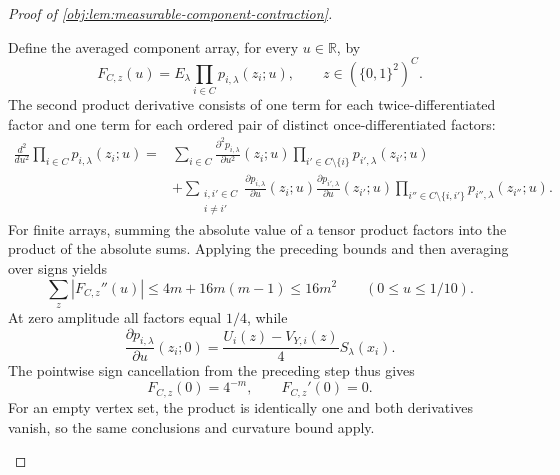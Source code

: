 \documentclass[11pt]{article}
\begin{document}
\begin{proof}[Proof of \cref{obj:lem:measurable-component-contraction}]
\begin{enumerate}
Define the averaged component array, for every \(u\in\mathbb R\), by
\[
F_{C,z}(u)=E_\lambda\prod_{i\in C}p_{i,\lambda}(z_i;u),
\qquad
z\in(\{0,1\}^2)^C.
\]
The second product derivative consists of one term for each twice-differentiated factor and one term for each ordered pair of distinct once-differentiated factors:
\[
\begin{aligned}
\frac{d^2}{du^2}\prod_{i\in C}p_{i,\lambda}(z_i;u)
={}&
\sum_{i\in C}
 \frac{\partial^2p_{i,\lambda}}{\partial u^2}(z_i;u)
 \prod_{i'\in C\setminus\{i\}}p_{i',\lambda}(z_{i'};u)\\
&+
\sum_{\substack{i,i'\in C\\i\ne i'}}
 \frac{\partial p_{i,\lambda}}{\partial u}(z_i;u)
 \frac{\partial p_{i',\lambda}}{\partial u}(z_{i'};u)
 \prod_{i''\in C\setminus\{i,i'\}}p_{i'',\lambda}(z_{i''};u).
\end{aligned}
\]
For finite arrays, summing the absolute value of a tensor product factors into the product of the absolute sums. Applying the preceding bounds and then averaging over signs yields
\[
\sum_z|F_{C,z}''(u)|
\le4m+16m(m-1)
\le16m^2
\qquad(0\le u\le1/10).
\]
At zero amplitude all factors equal \(1/4\), while
\[
\frac{\partial p_{i,\lambda}}{\partial u}(z_i;0)
=
\frac{U_i(z)-V_{Y,i}(z)}4S_\lambda(x_i).
\]
The pointwise sign cancellation from the preceding step thus gives
\[
F_{C,z}(0)=4^{-m},
\qquad
F_{C,z}'(0)=0.
\]
For an empty vertex set, the product is identically one and both derivatives vanish, so the same conclusions and curvature bound apply.


\end{enumerate}
\end{proof}
\end{document}

